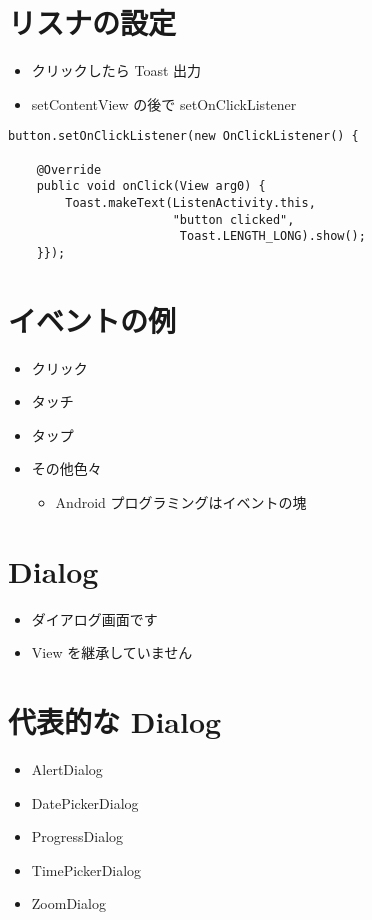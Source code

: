 \documentclass[slide,papersize]{jsarticle}
\begin{document}
\section*{リスナの設定}
\begin{itemize}
\item クリックしたら Toast 出力
\item setContentView の後で setOnClickListener
\end{itemize}
{\scriptsize
\begin{verbatim}
button.setOnClickListener(new OnClickListener() {

    @Override
    public void onClick(View arg0) {
        Toast.makeText(ListenActivity.this, 
                       "button clicked", 
                        Toast.LENGTH_LONG).show();
    }});
\end{verbatim}
}

\section*{イベントの例}
\medskip
\begin{itemize}
\item クリック
\medskip
\item タッチ
\medskip
\item タップ
\medskip
\item その他色々
 \begin{itemize}
 \item Android プログラミングはイベントの塊
 \end{itemize}
\end{itemize}

\section*{Dialog}
\bigskip
\begin{itemize}
\item ダイアログ画面です
\bigskip
\item View を継承していません
\end{itemize}

\section*{代表的な Dialog}
\bigskip
\begin{itemize}
\item AlertDialog
\bigskip
\item DatePickerDialog
\bigskip
\item ProgressDialog
\bigskip
\item TimePickerDialog
\bigskip
\item ZoomDialog
\end{itemize}
\end{document}
